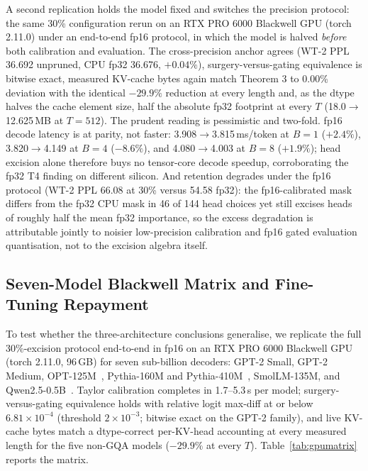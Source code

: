 \documentclass[10pt,journal,compsoc]{IEEEtran}
\begin{document}
A second replication holds the model fixed and switches the precision protocol:
the same 30\% configuration rerun on an RTX PRO 6000 Blackwell GPU (torch 2.11.0)
under an end-to-end fp16 protocol, in which the model is halved \emph{before}
both calibration and evaluation. The cross-precision anchor agrees (WT-2 PPL
36.692 unpruned, CPU fp32 36.676, $+0.04\%$), surgery-versus-gating equivalence
is bitwise exact, measured KV-cache bytes again match Theorem 3 to 0.00\%
deviation with the identical $-29.9\%$ reduction at every length and, as the
dtype halves the cache element size, half the absolute fp32 footprint at every
$T$ (18.0$\to$12.625\,MB at $T{=}512$). The prudent reading is pessimistic and
two-fold. fp16 decode latency is at parity, not faster: 3.908$\to$3.815\,ms/token
at $B{=}1$ ($+2.4\%$), 3.820$\to$4.149 at $B{=}4$ ($-8.6\%$), and 4.080$\to$4.003
at $B{=}8$ ($+1.9\%$); head excision alone therefore buys no tensor-core decode
speedup, corroborating the fp32 T4 finding on different silicon. And retention
degrades under the fp16 protocol (WT-2 PPL 66.08 at 30\% versus 54.58 fp32):
the fp16-calibrated mask differs from the fp32 CPU mask in 46 of 144 head
choices yet still excises heads of roughly half the mean fp32 importance, so
the excess degradation is attributable jointly to noisier low-precision
calibration and fp16 gated evaluation quantisation, not to the excision algebra
itself.

\subsection{Seven-Model Blackwell Matrix and Fine-Tuning Repayment}
\label{sec:gpumatrix}
To test whether the three-architecture conclusions generalise, we replicate the
full 30\%-excision protocol end-to-end in fp16 on an RTX PRO 6000 Blackwell GPU
(torch 2.11.0, 96\,GB) for seven sub-billion decoders: GPT-2 Small, GPT-2
Medium, OPT-125M~\cite{zhang2022opt}, Pythia-160M and
Pythia-410M~\cite{biderman2023pythia}, SmolLM-135M, and
Qwen2.5-0.5B~\cite{qwen2025qwen25}. Taylor calibration completes in 1.7--5.3\,s
per model; surgery-versus-gating equivalence holds with relative logit max-diff
at or below $6.81\times10^{-4}$ (threshold $2\times10^{-3}$; bitwise exact on
the GPT-2 family), and live KV-cache bytes match a dtype-correct per-KV-head
accounting at every measured length for the five non-GQA models
($-29.9\%$ at every $T$).
Table~\ref{tab:gpumatrix} reports the matrix.
\end{document}
